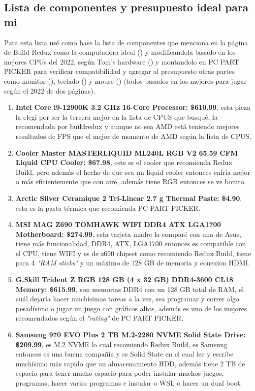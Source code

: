 \documentclass[12pt, a4paper]{article}
\begin{document}
\subsection{Lista de componentes y presupuesto ideal para mi}
Para esta lista usé como base la lista de componentes que menciona en la página de Build Redux como la computadora ideal (\cite{buildredux}) y modificandola basado en los mejores CPUs del 2022, según Tom's hardware (\cite{bestCPUS2022}) y montandolo en PC PART PICKER para verificar compatibilidad y agregar al presupuesto otras partes como monitor (\cite{bestMonitors2022}), teclado (\cite{bestKeyboards2022}) y mouse (\cite{bestMouses2022}) (todos basados en los mejores para jugar según el 2022 de dos páginas).
\begin{enumerate}
    \item \textbf{Intel Core i9-12900K 3.2 GHz 16-Core Processor: \$610.99}, esta pieza la elegí por ser la tercera mejor en la lista de CPUS que busqué, la recomendada por buildredux y aunque no sea AMD está teniendo mejores resultados de FPS que el mejor de momento de AMD según la lista de CPUS.
    \item \textbf{Cooler Master MASTERLIQUID ML240L RGB V2 65.59 CFM Liquid CPU Cooler: \$67.98}, este es el cooler que recomienda Redux Build, pero además el hecho de que sea un liquid cooler entonces enfría mejor o más eficientemente que con aire, además tiene RGB entonces se ve bonito.
    \item \textbf{ 	Arctic Silver Ceramique 2 Tri-Linear 2.7 g Thermal Paste: \$4.90}, esta es la pasta térmica que recomienda PC PART PICKER.
    \item \textbf{MSI MAG Z690 TOMHAWK WIFI DDR4 ATX LGA1700 Motherboard: \$274.99}, esta tarjeta madre la comparé con una de Asus, tiene más funcionalidad, DDR4, ATX, LGA1700 entonces es compatible con el CPU, tiene WIFI y es de z690 chipset como recomiendo Redux Build, tiene para 4 \textit{"RAM sticks"} y un máximo de 128 GB de memoria y conexion HDMI.
    \item \textbf{G.Skill Trident Z RGB 128 GB (4 x 32 GB) DDR4-3600 CL18 Memory: \$615.99}, son memorias DDR4 con un 128 GB total de RAM, el cuál dejaría hacer muchísimas tareas a la vez, sea programar y correr algo pesadísimo o jugar un juego con gráficos altos, además es uno de los mejores recomendados según el \textit{"rating"} de PC PART PICKER.
    \item \textbf{Samsung 970 EVO Plus 2 TB M.2-2280 NVME Solid State Drive: \$209.99}, es M.2 NVME lo cual recomiendo Redux Build, es Samsung entonces es una buena compañía y es Solid State en el cual lee y escribe muchísimo más rapido que un almacenamiento HDD, además tiene 2 TB de espacio para tener mucho espacio para poder instalar muchos juegos, programas, hacer varios programas e instalar o WSL o hacer un dual boot.

\end{enumerate}
\end{document}
